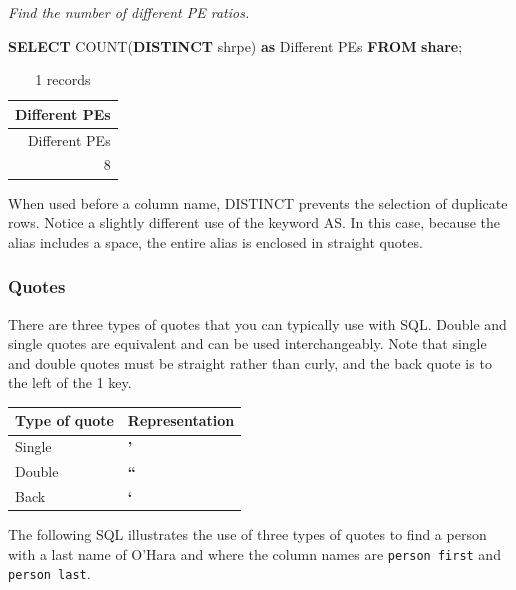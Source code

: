 \documentclass[
]{article}
\newenvironment{Shaded}{\begin{snugshade}}{\end{snugshade}}
\newcommand{\FunctionTok}[1]{\textcolor[rgb]{0.00,0.00,0.00}{#1}}
\newcommand{\KeywordTok}[1]{\textcolor[rgb]{0.13,0.29,0.53}{\textbf{#1}}}
\newcommand{\NormalTok}[1]{#1}
\newcommand{\StringTok}[1]{\textcolor[rgb]{0.31,0.60,0.02}{#1}}
\begin{document}
\emph{Find the number of different PE ratios.}

\begin{Shaded}
\begin{Highlighting}[]
\KeywordTok{SELECT} \FunctionTok{COUNT}\NormalTok{(}\KeywordTok{DISTINCT}\NormalTok{ shrpe) }\KeywordTok{as} \StringTok{\textquotesingle{}Different PEs\textquotesingle{}} \KeywordTok{FROM} \KeywordTok{share}\NormalTok{;}
\end{Highlighting}
\end{Shaded}

\begin{longtable}[]{@{}r@{}}
\caption{1 records}\tabularnewline
\toprule()
Different PEs \\
\midrule()
\endfirsthead
\toprule()
Different PEs \\
\midrule()
\endhead
8 \\
\bottomrule()
\end{longtable}

When used before a column name, DISTINCT prevents the selection of
duplicate rows. Notice a slightly different use of the keyword AS. In
this case, because the alias includes a space, the entire alias is
enclosed in straight quotes.

\hypertarget{quotes}{%
\subsubsection*{Quotes}\label{quotes}}

There are three types of quotes that you can typically use with SQL.
Double and single quotes are equivalent and can be used interchangeably.
Note that single and double quotes must be straight rather than curly,
and the back quote is to the left of the 1 key.

\begin{longtable}[]{@{}ll@{}}
\toprule()
Type of quote & Representation \\
\midrule()
\endhead
Single & \textbf{'} \\
Double & \textbf{``} \\
Back & \textbf{`} \\
\bottomrule()
\end{longtable}

The following SQL illustrates the use of three types of quotes to find a
person with a last name of O'Hara and where the column names are
\texttt{person\ first} and \texttt{person\ last}.
\end{document}
